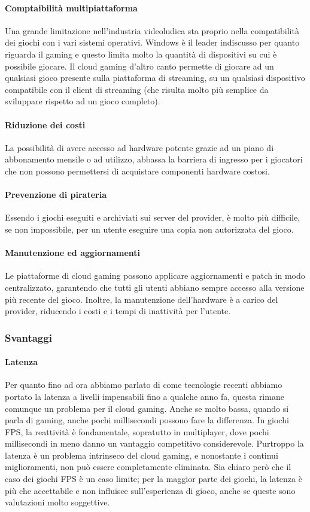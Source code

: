 \documentclass[12pt,a4paper,openright,twoside]{book}
\begin{document}
\paragraph{Comptaibilità multipiattaforma} Una grande limitazione nell'industria videoludica sta proprio nella compatibilità dei giochi con i vari sistemi operativi. Windows è il leader indiscusso per quanto riguarda il gaming e questo limita molto la quantità di dispositivi su cui è possibile giocare. Il cloud gaming d'altro canto permette di giocare ad un qualsiasi gioco presente sulla piattaforma di streaming, su un qualsiasi dispositivo compatibile con il client di streaming (che risulta molto più semplice da sviluppare rispetto ad un gioco completo).
\paragraph{Riduzione dei costi} La possibilità di avere accesso ad hardware potente grazie ad un piano di abbonamento mensile o ad utilizzo, abbassa la barriera di ingresso per i giocatori che non possono permettersi di acquistare componenti hardware costosi.
\paragraph{Prevenzione di pirateria} Essendo i giochi eseguiti e archiviati sui server del provider, è molto più difficile, se non impossibile, per un utente eseguire una copia non autorizzata del gioco.
\paragraph{Manutenzione ed aggiornamenti} Le piattaforme di cloud gaming possono applicare aggiornamenti e patch in modo centralizzato, garantendo che tutti gli utenti abbiano sempre accesso alla versione più recente del gioco. Inoltre, la manutenzione dell'hardware è a carico del provider, riducendo i costi e i tempi di inattività per l'utente.

\subsubsection{Svantaggi}
\paragraph{Latenza} Per quanto fino ad ora abbiamo parlato di come tecnologie recenti abbiamo portato la latenza a livelli impensabili fino a qualche anno fa, questa rimane comunque un problema per il cloud gaming. Anche se molto bassa, quando si parla di gaming, anche pochi millisecondi possono fare la differenza. In giochi \ac{FPS}, la reattività è fondamentale, sopratutto in multiplayer, dove pochi millisecondi in meno danno un vantaggio competitivo considerevole. Purtroppo la latenza è un problema intrinseco del cloud gaming, e nonostante i continui miglioramenti, non può essere completamente eliminata. Sia chiaro però che il caso dei giochi \ac{FPS} è un caso limite; per la maggior parte dei giochi, la latenza è più che accettabile e non influisce sull'esperienza di gioco, anche se queste sono valutazioni molto soggettive.
\end{document}
